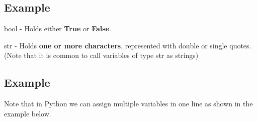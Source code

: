 \documentclass[13pt,a4paper,oneside]{book}
\begin{document}
\subsection*{Example}%
\label{sub:Example}

\begin{center}
	bool - Holds either \textbf{True} or \textbf{False}.
\end{center}

\begin{center}
	str - Holds \textbf{one or more characters}, represented with double or single quotes. (Note that it is common to call variables of type str as strings)
\end{center}
\subsection*{Example}%
\label{sub:E}

Note that in Python we can assign multiple variables in one line as shown in the example below.

\end{document}
